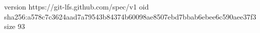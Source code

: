 version https://git-lfs.github.com/spec/v1
oid sha256:a578c7c3624aad7a79543b84374b60098ae8507ebd7bbab6ebee6c590aee37f3
size 93
